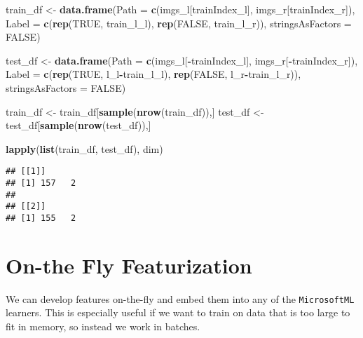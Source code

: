 \documentclass[]{book}
\newenvironment{Shaded}{\begin{snugshade}}{\end{snugshade}}
\newcommand{\KeywordTok}[1]{\textcolor[rgb]{0.13,0.29,0.53}{\textbf{#1}}}
\newcommand{\DataTypeTok}[1]{\textcolor[rgb]{0.13,0.29,0.53}{#1}}
\newcommand{\StringTok}[1]{\textcolor[rgb]{0.31,0.60,0.02}{#1}}
\newcommand{\OtherTok}[1]{\textcolor[rgb]{0.56,0.35,0.01}{#1}}
\newcommand{\OperatorTok}[1]{\textcolor[rgb]{0.81,0.36,0.00}{\textbf{#1}}}
\newcommand{\NormalTok}[1]{#1}
\theoremstyle{definition}
\theoremstyle{definition}
\theoremstyle{definition}
\theoremstyle{remark}
\begin{document}
\begin{Shaded}
\begin{Highlighting}[]
\NormalTok{train_df <-}\StringTok{ }\KeywordTok{data.frame}\NormalTok{(}\DataTypeTok{Path =} \KeywordTok{c}\NormalTok{(imgs_l[trainIndex_l], imgs_r[trainIndex_r]),}
                       \DataTypeTok{Label =} \KeywordTok{c}\NormalTok{(}\KeywordTok{rep}\NormalTok{(}\OtherTok{TRUE}\NormalTok{, train_l_l), }\KeywordTok{rep}\NormalTok{(}\OtherTok{FALSE}\NormalTok{, train_l_r)),}
                       \DataTypeTok{stringsAsFactors =} \OtherTok{FALSE}\NormalTok{)}

\NormalTok{test_df <-}\StringTok{ }\KeywordTok{data.frame}\NormalTok{(}\DataTypeTok{Path =} \KeywordTok{c}\NormalTok{(imgs_l[}\OperatorTok{-}\NormalTok{trainIndex_l], imgs_r[}\OperatorTok{-}\NormalTok{trainIndex_r]),}
                      \DataTypeTok{Label =} \KeywordTok{c}\NormalTok{(}\KeywordTok{rep}\NormalTok{(}\OtherTok{TRUE}\NormalTok{, l_l}\OperatorTok{-}\NormalTok{train_l_l), }\KeywordTok{rep}\NormalTok{(}\OtherTok{FALSE}\NormalTok{, l_r}\OperatorTok{-}\NormalTok{train_l_r)),}
                      \DataTypeTok{stringsAsFactors =} \OtherTok{FALSE}\NormalTok{)}

\NormalTok{train_df <-}\StringTok{ }\NormalTok{train_df[}\KeywordTok{sample}\NormalTok{(}\KeywordTok{nrow}\NormalTok{(train_df)),]}
\NormalTok{test_df <-}\StringTok{ }\NormalTok{test_df[}\KeywordTok{sample}\NormalTok{(}\KeywordTok{nrow}\NormalTok{(test_df)),]}

\KeywordTok{lapply}\NormalTok{(}\KeywordTok{list}\NormalTok{(train_df, test_df), dim)}
\end{Highlighting}
\end{Shaded}

\begin{verbatim}
## [[1]]
## [1] 157   2
## 
## [[2]]
## [1] 155   2
\end{verbatim}

\section{On-the Fly Featurization}\label{on-the-fly-featurization}

We can develop features on-the-fly and embed them into any of the
\texttt{MicrosoftML} learners. This is especially useful if we want to
train on data that is too large to fit in memory, so instead we work in
batches.
\end{document}
